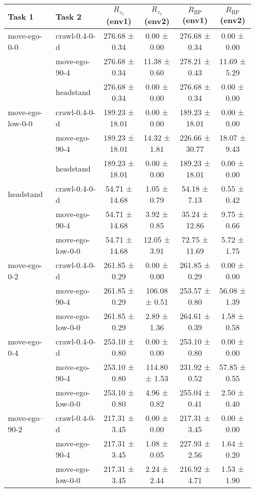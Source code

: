 \begin{tabular}{|l|l|c|c|c|c|}
\hline
Task 1 & Task 2 & $R_{z_1}$ (env1) & $R_{z_1}$ (env2) & $R_{\text{IIP}}$ (env1) & $R_{\text{IIP}}$ (env2) \\
\hline
move-ego-0-0 & crawl-0.4-0-d & 276.68 ± 0.34 & 0.00 ± 0.00 & 276.68 ± 0.34 & 0.00 ± 0.00 \\
\hline
 & move-ego-90-4 & 276.68 ± 0.34 & 11.38 ± 0.60 & 278.21 ± 0.43 & 11.69 ± 5.29 \\
\hline
 & headstand & 276.68 ± 0.34 & 0.00 ± 0.00 & 276.68 ± 0.34 & 0.00 ± 0.00 \\
\hline
move-ego-low-0-0 & crawl-0.4-0-d & 189.23 ± 18.01 & 0.00 ± 0.00 & 189.23 ± 18.01 & 0.00 ± 0.00 \\
\hline
 & move-ego-90-4 & 189.23 ± 18.01 & 14.32 ± 1.81 & 226.66 ± 30.77 & 18.07 ± 9.43 \\
\hline
 & headstand & 189.23 ± 18.01 & 0.00 ± 0.00 & 189.23 ± 18.01 & 0.00 ± 0.00 \\
\hline
headstand & crawl-0.4-0-d & 54.71 ± 14.68 & 1.05 ± 0.79 & 54.18 ± 7.13 & 0.55 ± 0.42 \\
\hline
 & move-ego-90-4 & 54.71 ± 14.68 & 3.92 ± 0.85 & 35.24 ± 12.86 & 9.75 ± 0.66 \\
\hline
 & move-ego-low-0-0 & 54.71 ± 14.68 & 12.05 ± 3.91 & 72.75 ± 11.69 & 5.72 ± 1.75 \\
\hline
move-ego-0-2 & crawl-0.4-0-d & 261.85 ± 0.29 & 0.00 ± 0.00 & 261.85 ± 0.29 & 0.00 ± 0.00 \\
\hline
 & move-ego-90-4 & 261.85 ± 0.29 & 106.08 ± 0.51 & 253.57 ± 0.80 & 56.08 ± 1.39 \\
\hline
 & move-ego-low-0-0 & 261.85 ± 0.29 & 2.89 ± 1.36 & 264.61 ± 0.39 & 1.58 ± 0.58 \\
\hline
move-ego-0-4 & crawl-0.4-0-d & 253.10 ± 0.80 & 0.00 ± 0.00 & 253.10 ± 0.80 & 0.00 ± 0.00 \\
\hline
 & move-ego-90-4 & 253.10 ± 0.80 & 114.80 ± 1.53 & 231.92 ± 0.52 & 57.85 ± 0.55 \\
\hline
 & move-ego-low-0-0 & 253.10 ± 0.80 & 4.96 ± 0.82 & 255.04 ± 0.41 & 2.50 ± 0.40 \\
\hline
move-ego--90-2 & crawl-0.4-0-d & 217.31 ± 3.45 & 0.00 ± 0.00 & 217.31 ± 3.45 & 0.00 ± 0.00 \\
\hline
 & move-ego-90-4 & 217.31 ± 3.45 & 1.08 ± 0.05 & 227.93 ± 2.56 & 1.64 ± 0.20 \\
\hline
 & move-ego-low-0-0 & 217.31 ± 3.45 & 2.24 ± 2.44 & 216.92 ± 4.71 & 1.53 ± 1.90 \\

\end{tabular}
